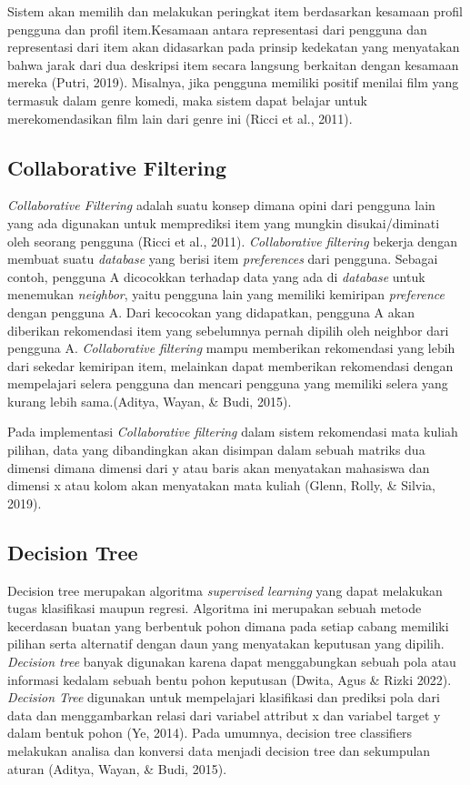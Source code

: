 Sistem akan memilih dan melakukan peringkat item berdasarkan kesamaan profil pengguna dan profil item.Kesamaan antara representasi dari pengguna dan representasi dari
item akan didasarkan pada prinsip kedekatan yang menyatakan bahwa jarak dari dua deskripsi item secara langsung berkaitan dengan kesamaan mereka (Putri, 2019).
Misalnya, jika pengguna memiliki positif menilai film yang termasuk dalam genre komedi, maka sistem dapat belajar untuk
merekomendasikan film lain dari genre ini {(Ricci et al., 2011)}.


\subsection{Collaborative Filtering}
\emph{Collaborative Filtering} adalah suatu konsep dimana opini dari pengguna lain yang ada digunakan untuk memprediksi item yang mungkin disukai/diminati oleh seorang pengguna {(Ricci et al., 2011)}.
\emph{Collaborative filtering} bekerja dengan membuat suatu \emph{database} yang berisi item \emph{preferences} dari pengguna. Sebagai contoh, pengguna A dicocokkan terhadap data yang ada di \emph{database} untuk menemukan
\emph{neighbor}, yaitu pengguna lain yang memiliki kemiripan \emph{preference} dengan pengguna A. Dari kecocokan yang didapatkan, pengguna A akan diberikan rekomendasi item yang sebelumnya pernah dipilih oleh neighbor dari
pengguna A. \emph{Collaborative filtering} mampu memberikan rekomendasi yang lebih dari sekedar kemiripan item, melainkan dapat memberikan rekomendasi dengan mempelajari selera pengguna dan mencari pengguna yang memiliki selera yang kurang lebih sama.{(Aditya, Wayan, \& Budi, 2015)}.

Pada implementasi \emph{Collaborative filtering} dalam sistem rekomendasi mata kuliah pilihan, data yang dibandingkan akan disimpan dalam sebuah matriks dua dimensi dimana dimensi dari y atau baris akan menyatakan mahasiswa dan dimensi x atau kolom akan menyatakan mata kuliah
  {(Glenn, Rolly, \& Silvia, 2019)}.


\subsection{Decision Tree}
Decision tree merupakan algoritma \emph{supervised learning} yang dapat melakukan tugas klasifikasi maupun regresi. Algoritma ini merupakan sebuah metode kecerdasan buatan yang berbentuk pohon dimana pada setiap cabang memiliki
pilihan serta alternatif dengan daun yang menyatakan keputusan yang dipilih. \emph{Decision tree} banyak digunakan karena dapat menggabungkan sebuah pola atau informasi kedalam sebuah bentu pohon keputusan {(Dwita, Agus \& Rizki 2022)}.
\emph{Decision Tree} digunakan untuk mempelajari klasifikasi dan prediksi pola dari data dan menggambarkan relasi dari variabel attribut x dan variabel target y dalam bentuk pohon {(Ye, 2014)}. Pada umumnya, decision tree classifiers
melakukan analisa dan konversi data menjadi decision tree dan sekumpulan aturan {(Aditya, Wayan, \& Budi, 2015)}.

